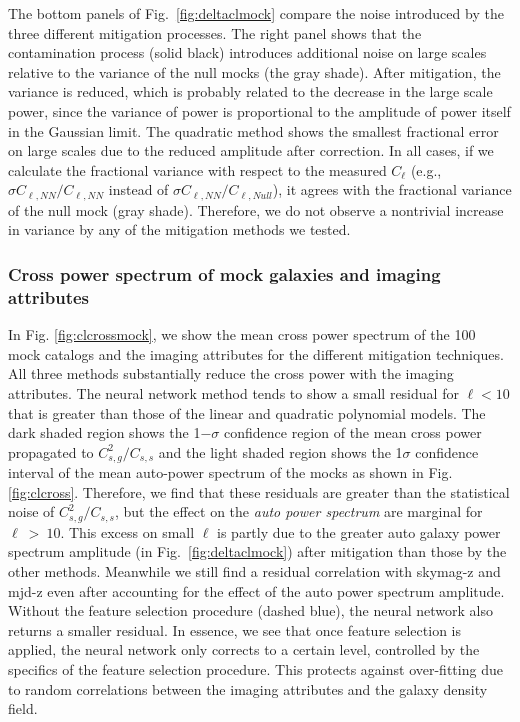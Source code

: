 The bottom panels of Fig.~\ref{fig:deltaclmock} compare the noise introduced by the three different mitigation processes. The right panel shows that the contamination process (solid black) introduces additional noise on large scales relative to the variance of the null mocks (the gray shade). After mitigation, the variance is reduced, which is probably related to the decrease in the large scale power, since the variance of power is proportional to the amplitude of power itself in the Gaussian limit. The quadratic method shows the smallest fractional error on large scales due to the reduced amplitude after correction. In all cases, if we calculate the fractional variance with respect to the measured $C_\ell$ (e.g., $\sigma C_{\ell, NN}/C_{\ell, NN}$ instead of  $\sigma C_{\ell, NN}/C_{\ell, Null}$), it agrees with the fractional variance of the null mock (gray shade). Therefore, we do not observe a nontrivial increase in variance by any of the mitigation methods we tested.


\subsubsection{Cross power spectrum of mock galaxies and imaging attributes}
In Fig. \ref{fig:clcrossmock}, we show the mean cross power spectrum of the 100 mock catalogs and the imaging attributes for the different mitigation techniques. All three methods substantially reduce the cross power with the imaging attributes. The neural network method tends to show a small residual for $\ell <10$ that is greater than those of the linear and quadratic polynomial models. The dark shaded region shows the 1$-\sigma$ confidence region of the mean cross power propagated to $C_{s,g}^{2}/C_{s,s}$ and the light shaded region shows the 1$\sigma$ confidence interval of the mean auto-power spectrum of the mocks as shown in Fig. \ref{fig:clcross}. Therefore, we find that these residuals are greater than the statistical noise of $C_{s,g}^{2}/C_{s,s}$, but  the effect on the \textit{auto power spectrum} are marginal for $\ell~ >~ 10$. This excess on small $\ell$ is partly due to the greater auto galaxy power spectrum amplitude (in Fig.~\ref{fig:deltaclmock}) after mitigation than those by the other methods. Meanwhile we still find a residual correlation with skymag-z and mjd-z even after accounting for the effect of the auto power spectrum amplitude. Without the feature selection procedure (dashed blue), the neural network also returns a smaller residual. In essence, we see that once feature selection is applied, the neural network only corrects to a certain level, controlled by the specifics of the feature selection procedure. This protects against over-fitting due to random correlations between the imaging attributes and the galaxy density field.\\

